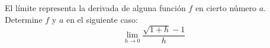 \item El límite representa la derivada de alguna función $f$ en cierto número $a$. Determine $f$ y $a$ en el siguiente caso:
$$\lim_{h \to 0} \frac{\sqrt{1 + h} - 1}{h}$$
